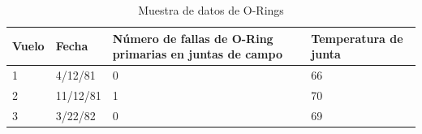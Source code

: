 \begin{landscape} 


\begin{table}[h]
\caption{Muestra de datos de O-Rings}
\begin{turn}{0}

\centering

\begin{tabular}{|l|l|l|l|} 
\hline
Vuelo & Fecha    & N\'umero de fallas de O-Ring primarias en juntas de campo & Temperatura de junta  \\ 
\hline
1     & 4/12/81  & 0                                                               & 66                    \\
2     & 11/12/81 & 1                                                               & 70                    \\
3     & 3/22/82  & 0                                                               & 69                    \\


\end{tabular}
\end{turn}
\end{table}
\end{landscape}
